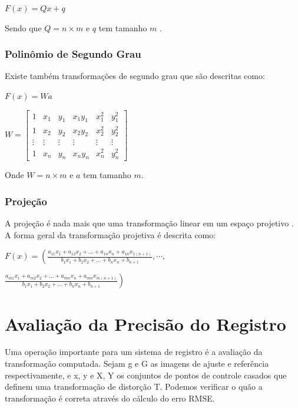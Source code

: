 \documentclass[9pt, a4paper, nofonttune, journal]{IEEEtran}
\begin{document}
\begin{center}
$F(x)=Qx+q$\end{center}
Sendo que $Q=n\times m$ e $q$ tem tamanho $m$ \cite{CGPPBook1}.

\subsubsection{Polinômio de Segundo Grau}
Existe também transformações de segundo grau que são descritas como:
\begin{center}
$F(x)=Wa$\end{center}

\begin{center}
$W=\begin{bmatrix}1 & x_{1} & y_{1} & x_{1}y_{1} & x_{1}^{2} & y_{1}^{2}\\
1 & x_{2} & y_{2} & x_{2}y_{2} & x_{2}^{2} & y_{2}^{2}\\
\vdots & \vdots & \vdots & \vdots & \vdots & \vdots\\
1 & x_{n} & y_{n} & x_{n}y_{n} & x_{n}^{2} & y_{n}^{2}
\end{bmatrix}$\end{center}
Onde $W=n\times m$ e $a$ tem tamanho $m$.\cite{Schowengerdt}

\subsubsection{Projeção}

A projeção é nada mais que uma transformação linear em um espaço projetivo \cite{CGPPBook1}. A forma geral da transformação projetiva é descrita como:

$F(x)=\left( \frac{a_{11}x_{1}+a_{12}x_{2}+...+a_{1n}x_{n}+a_{1n}x_{1(n+1)}}{b_{1}x_{1}+b_{2}x_{2}+...+b_{n}x_{n}+b_{n+1}},\cdots,\right.$

\begin{center}
$\left. \frac{a_{m1}x_{1}+a_{m2}x_{2}+...+a_{mn}x_{n}+a_{mn}x_{m(n+1)}}{b_{1}x_{1}+b_{2}x_{2}+...+b_{n}x_{n}+b_{n+1}} \right)$\end{center}

\section{Avaliação da Precisão do Registro}
Uma operação importante para um sistema de registro é a avaliação da transformação computada. Sejam {g} e {G} as imagens de ajuste e referência respectivamente, e {x, y} e {X, Y} os conjuntos de pontos de controle casados que definem uma transformação de distorção {T}. Podemos verificar o quão a transformação é correta através do cálculo do erro RMSE.
\end{document}
